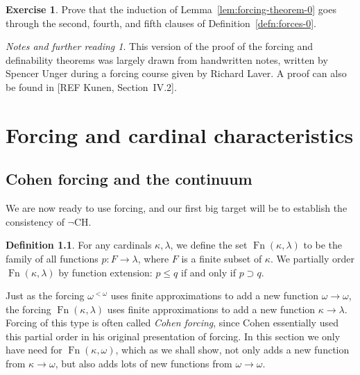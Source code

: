 \documentclass[11pt,oneside]{amsbook}
\DeclareMathOperator{\Fn}{Fn}
\theoremstyle{definition}
\newtheorem{exerc}{Exercise}[section]
\theoremstyle{plain}
\theoremstyle{definition}
\newtheorem{defn}[thm]{Definition}
\theoremstyle{remark}
\newtheorem*{notes}{Notes and further reading}
\numberwithin{equation}{section}
\numberwithin{figure}{section}
\begin{document}
\begin{exerc}
  \label{exerc:forcing-clauses-245}
  Prove that the induction of Lemma~\ref{lem:forcing-theorem-0} goes through the second, fourth, and fifth clauses of Definition~\ref{defn:forces-0}.
\end{exerc}

\begin{notes}
  This version of the proof of the forcing and definability theorems was largely drawn from handwritten notes, written by Spencer Unger during a forcing course given by Richard Laver. A proof can also be found in [REF Kunen, Section~IV.2].
\end{notes}


\chapter{Forcing and cardinal characteristics}

\section{Cohen forcing and the continuum}

We are now ready to use forcing, and our first big target will be to establish the consistency of $\neg$CH.

\begin{defn}
  For any cardinals $\kappa,\lambda$, we define the set $\Fn(\kappa,\lambda)$ to be the family of all functions $p\colon F\to\lambda$, where $F$ is a finite subset of $\kappa$. We partially order $\Fn(\kappa,\lambda)$ by function extension: $p\leq q$ if and only if $p\supset q$.
\end{defn}

Just as the forcing $\omega^{<\omega}$ uses finite approximations to add a new function $\omega\to\omega$, the forcing $\Fn(\kappa,\lambda)$ uses finite approximations to add a new function $\kappa\to\lambda$. Forcing of this type is often called \emph{Cohen forcing}, since Cohen essentially used this partial order in his original presentation of forcing. In this section we only have need for $\Fn(\kappa,\omega)$, which as we shall show, not only adds a new function from $\kappa\to\omega$, but also adds lots of new functions from $\omega\to\omega$.
\end{document}
